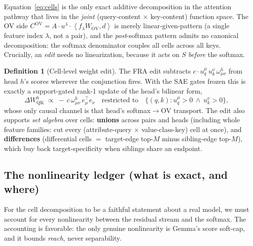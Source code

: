 \documentclass[11pt]{article}
\newcommand{\ip}[2]{\left\langle #1, #2 \right\rangle}
\newcommand{\OV}{\mathrm{OV}}
\newcommand{\QK}{\mathrm{QK}}
\theoremstyle{definition}
\newtheorem{definition}{Definition}
\theoremstyle{plain}
\theoremstyle{remark}
\begin{document}
Equation~\eqref{eq:cells} is the only exact additive decomposition in the attention pathway that lives in the \emph{joint} (query-content $\times$ key-content) function space. The OV side $C^{\OV} = A\cdot u^\lambda\cdot\ip{f_\lambda W_{\OV}}{d}$ is merely linear-given-pattern (a single feature index $\lambda$, not a pair), and the \emph{post}-softmax pattern admits no canonical decomposition: the softmax denominator couples all cells across all keys. Crucially, an \emph{edit} needs no linearization, because it acts on $S$ \emph{before} the softmax.

\begin{definition}[Cell-level weight edit]\label{def:edit}
The FRA edit subtracts $c\cdot u^\mu_q\,u^\nu_k\,\omega^h_{\mu\nu}$ from head $h$'s scores wherever the conjunction fires. With the SAE gates frozen this is exactly a support-gated rank-1 update of the head's bilinear form,
\begin{equation}
  \Delta W_{\QK}^h \;\propto\; -\,c\,\omega^h_{\mu\nu}\, e_\mu^{\top} e_\nu
  \quad\text{restricted to}\quad \{(q,k): u^\mu_q>0 \ \wedge\ u^\nu_k>0\},
\end{equation}
whose only causal channel is that head's softmax$\to$OV transport. The edit also supports \emph{set algebra} over cells: \textbf{unions} across pairs and heads (including whole feature families: cut every (attribute-query $\times$ value-class-key) cell at once), and \textbf{differences} (differential cells $=$ target-edge top-$M$ minus sibling-edge top-$M$), which buy back target-specificity when siblings share an endpoint.
\end{definition}

\subsection{The nonlinearity ledger (what is exact, and where)}\label{sec:ledger}

For the cell decomposition to be a faithful statement about a real model, we must account for every nonlinearity between the residual stream and the softmax. The accounting is favorable: the only genuine nonlinearity is Gemma's score soft-cap, and it bounds \emph{reach}, never separability.
\end{document}
